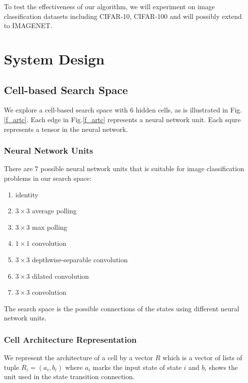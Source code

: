 \documentclass[conference]{IEEEtran}
\begin{document}
    To test the effectiveness of our algorithm, we will experiment on image classification datasets including CIFAR-10, CIFAR-100 and will possibly extend to IMAGENET.


  \section{System Design}
  \subsection{Cell-based Search Space}

  We explore a cell-based search space with 6 hidden cells, as is illustrated in Fig.\ref{f_artc}. Each edge in Fig.\ref{f_artc} represents a neural network unit. Each squre represents a tensor in the neural network.

  \subsubsection{Neural Network Units}
  
  There are 7 possible neural network units that is suitable for image classification problems in our search space:

      \begin{enumerate}
        \item identity
        \item $3\times3$ average polling
        \item $3\times3$ max polling
        \item $1\times1$ convolution
        \item $3\times3$ depthwise-separable convolution
        \item $3\times3$ dilated convolution
        \item $3\times3$ convolution
      \end{enumerate}

  The search space is the possible connections of the states using different neural network units.

  \subsubsection{Cell Architecture Representation}

  We represent the architecture of a cell by a vector $R$ which is a vector of lists of tuple $R_{i} = (a_i, b_i)$ where $a_i$ marks the input state of state $i$ and $b_i$ shows the unit used in the state transition connection.
\end{document}

